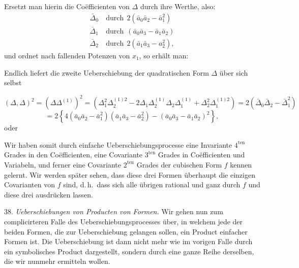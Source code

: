 Ersetzt man hierin die Co\"efficienten von $\Delta$ durch ihre Werthe,
also:
\[
\begin{aligned}
\bar\Delta_0 &\ \text{durch}\ \ 2(\bar a_0\bar a_2-\bar a_1^2)\\
\bar\Delta_1 &\ \text{durch}\ \ (\bar a_0\bar a_3-\bar a_1\bar a_2)\\
\bar\Delta_2 &\ \text{durch}\ \ 2(\bar a_1\bar a_3-a_2^2),
\end{aligned}
\]
und ordnet nach fallenden Potenzen von $x_1$, so erhält man:

Endlich liefert die zweite Ueberschiebung der quadratischen Form
$\Delta$ über sich selbst


\[
(\Delta, \Delta)^2=(\Delta \Delta^{(1)})^2=(\Delta_1^2\Delta_2^{(1)2}-2\Delta_1\Delta_2^{(1)}\Delta_2\Delta_1^{(1)}+\Delta_2^2\Delta_1^{(1)2})=2(\bar\Delta_0\bar\Delta_2-\bar\Delta_1^2)
\]
\[
=2\left\{4(\bar a_0\bar a_2-\bar a_1^2)(\bar a_1\bar a_3-\bar a_2^2)-(\bar a_0\bar a_3-\bar a_1\bar a_2)^2\right\},
\]
oder

Wir haben somit durch einfache Ueberschiebungsprocesse eine
Invariante $4^{\text{ten}}$ Grades in den Co\"efficienten, eine
Covariante $3^{\text{ten}}$ Grades in Co\"efficienten und Variabeln,
und ferner eine Covariante $2^{\text{ten}}$ Grades der cubischen Form
$f$ kennen gelernt. Wir werden später sehen, dass diese drei Formen
überhaupt die einzigen  Covarianten von $f$
sind, d.\,h.\ dass sich alle übrigen rational und ganz durch $f$ und
diese drei ausdrücken lassen.

38. \textit{Ueberschiebungen von Producten von Formen.} Wir gehen nun
zum complicirteren Falle des Ueberschiebungsprocesses über, in welchem
jede der beiden Formen, die zur Ueberschiebung gelangen sollen, ein
Product einfacher Formen ist. Die Ueberschiebung ist dann nicht mehr
wie im vorigen Falle durch ein  symbolisches
Product dargestellt, sondern durch eine ganze Reihe derselben, die wir
nunmehr ermitteln wollen.

